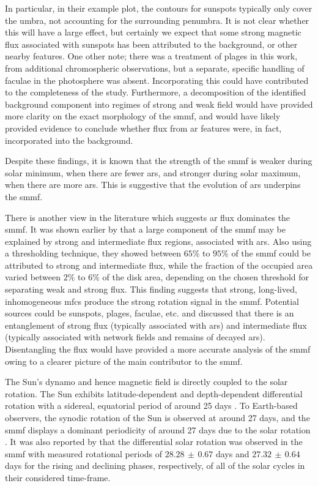 In particular, in their example plot, the contours for sunspots typically only cover the umbra, not accounting for the surrounding penumbra. It is not clear whether this will have a large effect, but certainly we expect that some strong magnetic flux associated with sunspots has been attributed to the background, or other nearby features. One other note; there was a treatment of plages in this work, from additional chromospheric observations, but a separate, specific handling of faculae in the photosphere was absent. Incorporating this could have contributed to the completeness of the study. Furthermore, a decomposition of the identified background component into regimes of strong and weak field would have provided more clarity on the exact morphology of the \gls{smmf}, and would have likely provided evidence to conclude whether flux from \gls{ar} features were, in fact, incorporated into the background.

Despite these findings, it is known that the strength of the \gls{smmf} is weaker during solar minimum, when there are fewer \glspl{ar}, and stronger during solar maximum, when there are more \glspl{ar}. This is suggestive that the evolution of \glspl{ar} underpins the \gls{smmf}.

There is another view in the literature which suggests \gls{ar} flux dominates the \gls{smmf}. It was shown earlier by \citet{kutsenko_contribution_2017} that a large component of the \gls{smmf} may be explained by strong and intermediate flux regions, associated with \glspl{ar}. Also using a thresholding technique, they showed between $65 \%$ to $95 \%$ of the \gls{smmf} could be attributed to strong and intermediate flux, while the fraction of the occupied area varied between $2 \%$ to $6 \%$ of the disk area, depending on the chosen threshold for separating weak and strong flux. This finding suggests that strong, long-lived, inhomogeneous \gls{mfc}s produce the strong rotation signal in the \gls{smmf}. Potential sources could be sunspots, plages, faculae, etc. and \citet{kutsenko_contribution_2017} discussed that there is an entanglement of strong flux (typically associated with \glspl{ar}) and intermediate flux (typically associated with network fields and remains of decayed \glspl{ar}). Disentangling the flux would have provided a more accurate analysis of the \gls{smmf} owing to a clearer picture of the main contributor to the \gls{smmf}.

The Sun's dynamo and hence magnetic field is directly coupled to the solar rotation. The Sun exhibits latitude-dependent and depth-dependent differential rotation with a sidereal, equatorial period of around 25 days \citep{howe_solar_2009}. To Earth-based observers, the synodic rotation of the Sun is observed at around 27 days, and the \gls{smmf} displays a dominant periodicity of around 27 days due to the solar rotation \citep{chaplin_studies_2003, xie_temporal_2017, bose_variability_2018}. It was also reported by \citet{xie_temporal_2017} that the differential solar rotation was observed in the \gls{smmf} with measured rotational periods of $28.28 \, \pm \, 0.67$ days and $27.32 \, \pm \, 0.64$ days for the rising and declining phases, respectively, of all of the solar cycles in their considered time-frame.

